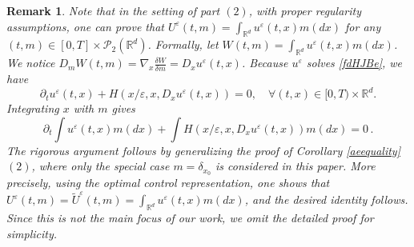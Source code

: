 \documentclass[reqno,11pt]{amsart}
\newtheorem{remark}[theorem]{Remark}
\numberwithin{equation}{section}
\newcommand{\yh}[1]{{\color{orange}[YH: #1]}}
\newcommand{\zd}[1]{{\color{brown}[ZD:#1]}}
\newcommand{\R}{\mathbb{R}} %
\newcommand{\e}{\varepsilon}
\newcommand{\nd}{\noindent}
\begin{document}
        \nd
        \begin{remark}
        Note that in the setting of part $(2)$, with proper regularity assumptions, one can prove that $U^\e(t,m)=\int_{\R^d} u^\e(t,x)m(dx)$ for any $(t, m) \in [0,T] \times \mathcal{P}_2(\R^d)$. Formally, let $W(t,m)=\int_{\R^d} u^\e(t,x)m(dx)$. We notice $D_mW(t,m)=\nabla_x \frac{\delta W}{\delta m}=D_x u^\e(t,x)$. Because $u^\e$ solves \eqref{fdHJBe}, we have
        \[
        \partial_tu^\e(t,x)+H(x/\e,x,D_xu^\e(t,x))=0,\quad \forall (t,x) \in [0,T) \times \R^d.
        \]
        Integrating $x$ with $m$ gives
        \[
        \partial_t \int u^\e (t,x)m(dx)+\int H(x/\e,x,D_x u^\e(t,x))m(dx)=0\,.
        \]
        The rigorous argument follows by generalizing the proof of Corollary \ref{aeequality} $(2)$, where only the special case $m=\delta_{x_0}$ is considered in this paper. More precisely, using the optimal control representation, one shows that $U^\e(t,m)=\widetilde U^\e(t,m)=\int_{\mathbb{R}^d} u^\e(t,x) m(dx)$,
        and the desired identity follows. Since this is not the main focus of our work, we omit the detailed proof for simplicity.

\end{remark}
\end{document}
